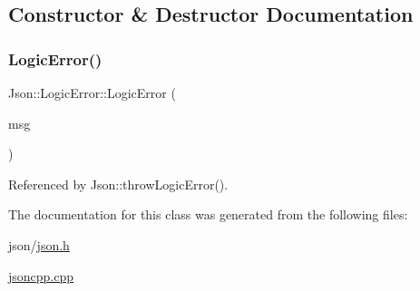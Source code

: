 \subsection{Constructor \& Destructor Documentation}
\mbox{\label{classJson_1_1LogicError_acca679aa49768a4a1de7b705c67c2919_acca679aa49768a4a1de7b705c67c2919}} 
\subsubsection{\texorpdfstring{Logic\+Error()}{LogicError()}}
{\footnotesize\ttfamily Json\+::\+Logic\+Error\+::\+Logic\+Error (\begin{DoxyParamCaption}\item[{\hyperlink{json_8h_a1e723f95759de062585bc4a8fd3fa4be_a1e723f95759de062585bc4a8fd3fa4be}{J\+S\+O\+N\+C\+P\+P\+\_\+\+S\+T\+R\+I\+NG} const \&}]{msg }\end{DoxyParamCaption})}



Referenced by Json\+::throw\+Logic\+Error().



The documentation for this class was generated from the following files\+:\begin{DoxyCompactItemize}
\item 
json/\hyperlink{json_8h}{json.\+h}\item 
\hyperlink{jsoncpp_8cpp}{jsoncpp.\+cpp}\end{DoxyCompactItemize}
